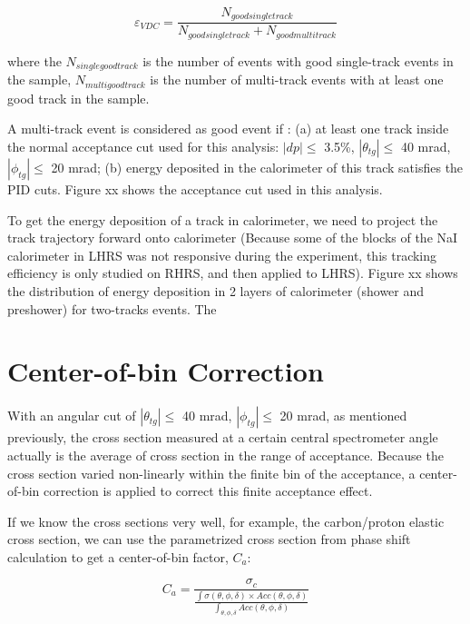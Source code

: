 \begin{equation}
\varepsilon_{VDC} = \frac{N_{goodsingletrack}}{N_{goodsingletrack}+N_{goodmultitrack}}
\end{equation}

where the $N_{singlegoodtrack}$ is the number of events with good single-track events in the sample,
$N_{multigoodtrack}$ is the number of multi-track events with at least one good track in the sample.

A multi-track event is considered as good event if :
(a) at least one track inside the normal acceptance cut used for this analysis:
$|dp|\leq$ 3.5\%, $|\theta_{tg}| \leq$ 40 mrad, $|\phi_{tg}| \leq$ 20 mrad;
(b) energy deposited in the calorimeter of this track satisfies the PID cuts.
Figure xx shows the acceptance cut used in this analysis.

To get the energy deposition of a track in calorimeter, we need to project the
track trajectory forward onto calorimeter (Because some of the blocks of the NaI calorimeter in LHRS was
not responsive during the experiment, this tracking efficiency is only studied on
RHRS, and then applied to LHRS).
Figure xx shows the distribution of energy deposition in 2 layers of calorimeter (shower and preshower)
for two-tracks events. The  
\section{Center-of-bin Correction}

With an angular cut of $|\theta_{tg}|\leq$ 40 mrad,  $|\phi_{tg}| \leq$ 20 mrad, as mentioned previously,
the cross section measured at a certain central spectrometer angle actually is the average of cross section
in the range of acceptance. Because the cross section varied non-linearly within the finite bin of the acceptance,
a center-of-bin correction is applied to correct this finite acceptance effect.

If we know the cross sections very well, for example, the carbon/proton elastic cross section,
we can use the parametrized cross section from phase shift calculation to get a center-of-bin factor, $C_a$:

\begin{equation}
C_a = \frac{\sigma_c}{ \frac{\int \sigma(\theta,\phi,\delta) \times
Acc(\theta,\phi,\delta)}{\int_{\theta,\phi,\delta}Acc(\theta,\phi,\delta) }}
\end{equation}

